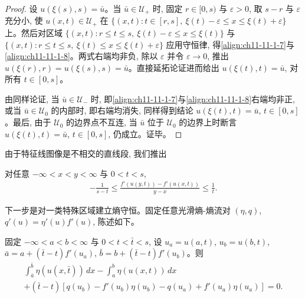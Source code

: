 \documentclass[../../main.tex]{subfiles}
\begin{document}
\begin{proof}
设 $u(\xi(s),s)=\bar u$。当 $\bar u\in\mathscr{U}_+$ 时, 固定 $r\in[0,s)$ 与 $\varepsilon>0$, 取 $s-r$ 与 $\varepsilon$ 充分小, 使 $u(x,t)\in\mathscr{U}_+$ 在 $\{(x,t):t\in[r,s],\ \xi(t)-\varepsilon\leqslant x\leqslant\xi(t)+\varepsilon\}$ 上。然后对区域 $\{(x,t):r\leqslant t\leqslant s,\ \xi(t)-\varepsilon\leqslant x\leqslant\xi(t)\}$ 与 $\{(x,t):r\leqslant t\leqslant s,\ \xi(t)\leqslant x\leqslant\xi(t)+\varepsilon\}$ 应用守恒律, 得\eqref{align:ch11-11-1-7}与\eqref{align:ch11-11-1-8}。两式右端均非负, 除以 $\varepsilon$ 并令 $\varepsilon\to0$, 推出 $u(\xi(r),r)=u(\xi(s),s)=\bar u$。直接延拓论证进而给出 $u(\xi(t),t)=\bar u$, 对所有 $t\in[0,s]$。

由同样论证, 当 $\bar u\in\mathscr{U}_-$ 时, 即\eqref{align:ch11-11-1-7}与\eqref{align:ch11-11-1-8}右端均非正, 或当 $\bar u\in\mathscr{U}_0$ 的内部时, 即右端均消失, 同样得到结论 $u(\xi(t),t)=\bar u$, $t\in[0,s]$。最后, 由于 $\mathscr{U}_0$ 的边界点不互连, 当 $\bar u$ 位于 $\mathscr{U}_0$ 的边界上时断言 $u(\xi(t),t)=\bar u$, $t\in[0,s]$, 仍成立。证毕。
\end{proof}

由于特征线图像是不相交的直线段, 我们推出

\begin{corollary}\label{corollary:ch11-11-13-3}
对任意 $-\infty<x<y<\infty$ 与 $0<t<s$,
\begin{align}
-\frac{1}{s-t}\leqslant\frac{f'(u(y,t))-f'(u(x,t))}{y-x}\leqslant\frac{1}{t}.\label{align:ch11-11-13-3}
\end{align}
\end{corollary}

下一步是对一类特殊区域建立熵守恒。固定任意光滑熵-熵流对 $(\eta,q)$, $q'(u)=\eta'(u)f'(u)$, 陈述如下。

\begin{lemma}\label{lemma:ch11-11-13-4}
固定 $-\infty<a<b<\infty$ 与 $0<t<\bar t<s$, 设 $u_a=u(a,t)$, $u_b=u(b,t)$, $\bar a=a+(\bar t-t)f'(u_a)$, $\bar b=b+(\bar t-t)f'(u_b)$。则
\begin{align}
\int_{\bar a}^{\bar b}\eta(u(x,\bar t))\,dx-\int_a^b\eta(u(x,t))\,dx\nonumber\\
+(\bar t-t)[q(u_b)-f'(u_b)\eta(u_b)-q(u_a)+f'(u_a)\eta(u_a)]=0.\label{align:ch11-11-13-4}
\end{align}
\end{lemma}
\end{document}
